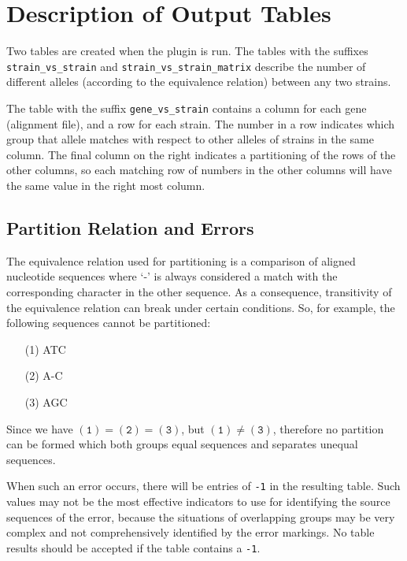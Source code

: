 \documentclass[12pt,letterpaper]{article}
\begin{document}
\newpage
\section{Description of Output Tables}
\parskip 10pt

Two tables are created when the plugin is run.  The tables with the suffixes
\texttt{strain\_vs\_strain} and \texttt{strain\_vs\_strain\_matrix} describe
the number of different alleles (according to the equivalence relation) between
any two strains.

The table with the suffix \texttt{gene\_vs\_strain} contains a column for each
gene (alignment file), and a row for each strain.  The number in a row
indicates which group that allele matches with respect to other alleles of
strains in the same column.  The final column on the right indicates a
partitioning of the rows of the other columns, so each matching row of numbers
in the other columns will have the same value in the right most column.

\subsection{Partition Relation and Errors}
The equivalence relation used for partitioning is a comparison of aligned
nucleotide sequences where `-' is always considered a match with the
corresponding character in the other sequence.  As a consequence, transitivity
of the equivalence relation can break under certain conditions.  So, for
example, the following sequences cannot be partitioned:

\parskip 0cm
\begin{enumerate}
\item[(1)] ATC
\item[(2)] A-C
\item[(3)] AGC
\end{enumerate}

\parskip 10pt

Since we have $(\texttt{1}) = (\texttt{2}) = (\texttt{3})$, but $(\texttt{1})
\ne (\texttt{3})$, therefore no partition can be formed which both groups equal
sequences and separates unequal sequences.

When such an error occurs, there will be entries of \texttt{-1} in the
resulting table.  Such values may not be the most effective indicators to use
for identifying the source sequences of the error, because the situations of
overlapping groups may be very complex and not comprehensively identified by
the error markings.  No table results should be accepted if the table contains
a \texttt{-1}.
\end{document}

